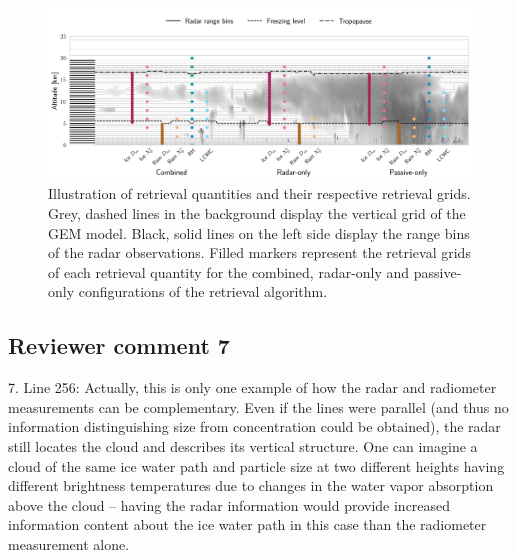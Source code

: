 \begin{figure}
\centering \includegraphics[width = 1.0\linewidth]{../plots/retrieval_sketch}
\caption{Illustration of retrieval quantities and their respective retrieval
  grids. Grey, dashed lines in the background display the vertical grid of the
  GEM model. Black, solid lines on the left side display the range bins of the
  radar observations. Filled markers represent the retrieval grids of each
  retrieval quantity for the combined, radar-only and passive-only
  configurations of the retrieval algorithm.}
\label{fig:retrieval_sketch}
\end{figure}




\subsection*{Reviewer comment 7}

7. Line 256: Actually, this is only one example of how the radar and radiometer
measurements can be complementary. Even if the lines were parallel (and thus no
information distinguishing size from concentration could be obtained), the radar
still locates the cloud and describes its vertical structure. One can imagine a
cloud of the same ice water path and particle size at two different heights
having different brightness temperatures due to changes in the water vapor
absorption above the cloud – having the radar information would provide
increased information content about the ice water path in this case than the
radiometer measurement alone.


